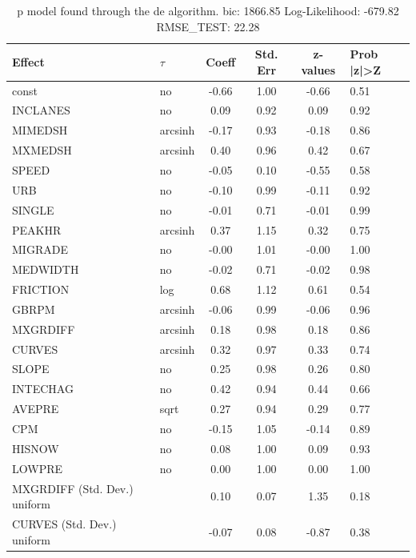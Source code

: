 \begin{table}
	\caption{p model found through the de algorithm. bic: 1866.85 Log-Likelihood: -679.82 RMSE_TEST: 22.28}
	\begin{center}
		\begin{tabular}{|l|l|c|c|c|l|}
			\hline
			Effect & $\tau$ & Coeff & Std. Err & z-values & Prob |z|>Z \\
			\hline
			const & no & -0.66 & 1.00 & -0.66 & 0.51 \\
			\hline
			INCLANES & no & 0.09 & 0.92 & 0.09 & 0.92 \\
			\hline
			MIMEDSH & arcsinh & -0.17 & 0.93 & -0.18 & 0.86 \\
			\hline
			MXMEDSH & arcsinh & 0.40 & 0.96 & 0.42 & 0.67 \\
			\hline
			SPEED & no & -0.05 & 0.10 & -0.55 & 0.58 \\
			\hline
			URB & no & -0.10 & 0.99 & -0.11 & 0.92 \\
			\hline
			SINGLE & no & -0.01 & 0.71 & -0.01 & 0.99 \\
			\hline
			PEAKHR & arcsinh & 0.37 & 1.15 & 0.32 & 0.75 \\
			\hline
			MIGRADE & no & -0.00 & 1.01 & -0.00 & 1.00 \\
			\hline
			MEDWIDTH & no & -0.02 & 0.71 & -0.02 & 0.98 \\
			\hline
			FRICTION & log & 0.68 & 1.12 & 0.61 & 0.54 \\
			\hline
			GBRPM & arcsinh & -0.06 & 0.99 & -0.06 & 0.96 \\
			\hline
			MXGRDIFF & arcsinh & 0.18 & 0.98 & 0.18 & 0.86 \\
			\hline
			CURVES & arcsinh & 0.32 & 0.97 & 0.33 & 0.74 \\
			\hline
			SLOPE & no & 0.25 & 0.98 & 0.26 & 0.80 \\
			\hline
			INTECHAG & no & 0.42 & 0.94 & 0.44 & 0.66 \\
			\hline
			AVEPRE & sqrt & 0.27 & 0.94 & 0.29 & 0.77 \\
			\hline
			CPM & no & -0.15 & 1.05 & -0.14 & 0.89 \\
			\hline
			HISNOW & no & 0.08 & 1.00 & 0.09 & 0.93 \\
			\hline
			LOWPRE & no & 0.00 & 1.00 & 0.00 & 1.00 \\
			\hline
			MXGRDIFF (Std. Dev.) uniform &  & 0.10 & 0.07 & 1.35 & 0.18 \\
			\hline
			CURVES (Std. Dev.) uniform &  & -0.07 & 0.08 & -0.87 & 0.38 \\

\end{tabular}
\end{center}
\end{table}
